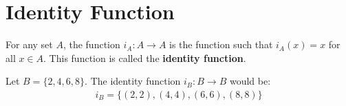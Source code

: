 \documentclass[../notes.tex]{subfiles}
\begin{document}
		\section{Identity Function}
			For any set $A$, the function $i_{A}: A \rightarrow A$ is the function such that $i_{A}(x) = x$ for all $x \in A$. This function is called the \textbf{identity function}.
			\begin{example}
				Let $B = \{2, 4, 6, 8\}$. The identity function $i_{B}: B \rightarrow B$ would be:
					\begin{align*}
						i_{B} = \bigl\{(2, 2), (4, 4), (6, 6), (8, 8)\bigr\}
					\end{align*}
			\end{example}
\end{document}
